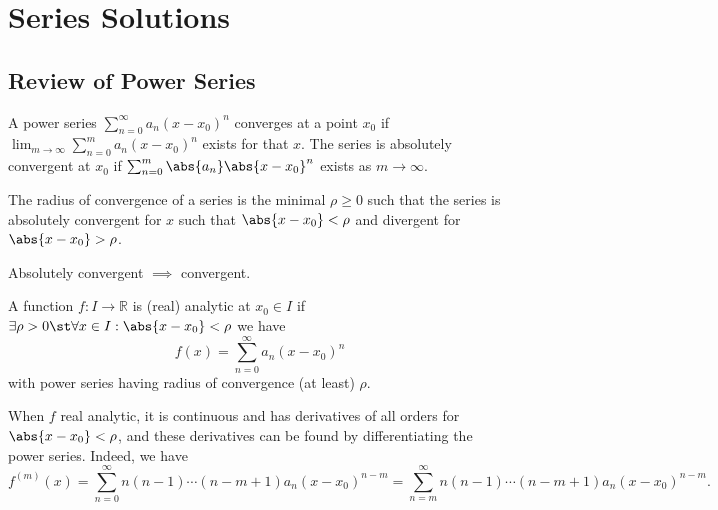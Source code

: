 \section{Series Solutions}

\subsection{Review of Power Series}

\begin{definition}[Convergence]
    A power series $\sum_{n=0}^\infty a_n(x-x_0)^n$ converges at a point $x_0$ if $\lim_{m \to \infty} \sum_{n=0}^m a_n (x-x_0)^n$ exists for that $x$. The series is absolutely convergent at $x_0$ if $\sum_{n=0}^m \abs{a_n}\abs{x - x_0}^n$ exists as $m \to \infty$.

    The radius of convergence of a series is the minimal $\rho \geq 0$ such that the series is absolutely convergent for $x$ such that $\abs{x - x_0} < \rho$ and divergent for $\abs{x - x_0} > \rho$.
\end{definition}
\begin{remark}
    Absolutely convergent $\implies$ convergent.
\end{remark}

\begin{definition}
    A function $f: I \to \mathbb{R}$ is (real) analytic at $x_0 \in I$ if $\exists \rho > 0 \st \forall x \in I : \abs{x - x_0} < \rho$ we have \[
    f(x) = \sum_{n=0}^{\infty}    a_n(x-x_0)^n
    \]
    with power series having radius of convergence (at least) $\rho$.
\end{definition}
\begin{remark}
    When $f$ real analytic, it is continuous and has derivatives of all orders for $\abs{x - x_0} < \rho$, and these derivatives can be found by differentiating the power series. Indeed, we have \[
    f^{(m)}(x) = \sum_{n=0}^\infty n (n-1) \cdots (n-m+1)a_n(x-x_0)^{n-m} = \sum_{n=m}^\infty n (n-1) \cdots (n-m+1)a_n(x-x_0)^{n-m}.    
    \]
\end{remark}